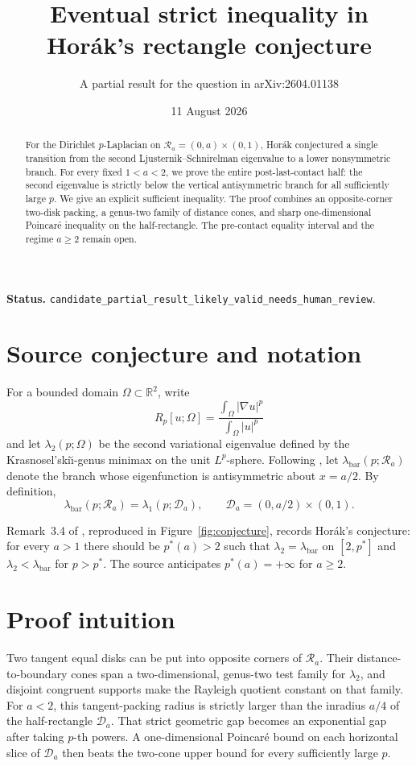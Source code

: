 \documentclass[11pt]{article}
\title{Eventual strict inequality in Hor\'ak's rectangle conjecture}
\author{A partial result for the question in arXiv:2604.01138}
\date{11 August 2026}
\newcommand{\R}{\mathbb R}
\newcommand{\Ra}{\mathcal R_a}
\newcommand{\Da}{\mathcal D_a}
\newcommand{\lbar}{\lambda_{\mathrm{bar}}}
\begin{document}
\maketitle

\noindent\textbf{Status.}
\texttt{candidate\_partial\_result\_likely\_valid\_needs\_human\_review}.

\begin{abstract}
For the Dirichlet \(p\)-Laplacian on
\(\Ra=(0,a)\times(0,1)\), Hor\'ak conjectured a single transition from the
second Ljusternik--Schnirelman eigenvalue to a lower nonsymmetric branch.
For every fixed \(1<a<2\), we prove the entire post-last-contact half: the
second eigenvalue is strictly below the vertical antisymmetric branch for all
sufficiently large \(p\). We give an explicit sufficient inequality. The
proof combines an opposite-corner two-disk packing, a genus-two family of
distance cones, and sharp one-dimensional Poincar\'e inequality on the
half-rectangle. The pre-contact equality interval and the regime \(a\ge2\)
remain open.
\end{abstract}

\section{Source conjecture and notation}

For a bounded domain \(\Omega\subset\R^2\), write
\[
 R_p[u;\Omega]=
 \frac{\int_\Omega |\nabla u|^p}{\int_\Omega |u|^p}
\]
and let \(\lambda_2(p;\Omega)\) be the second variational eigenvalue defined
by the Krasnosel'ski\u\i{}-genus minimax on the unit \(L^p\)-sphere.
Following \cite{source}, let \(\lbar(p;\Ra)\) denote the branch whose
eigenfunction is antisymmetric about \(x=a/2\). By definition,
\[
 \lbar(p;\Ra)=\lambda_1(p;\Da),
 \qquad \Da=(0,a/2)\times(0,1).
\]

Remark~3.4 of \cite{source}, reproduced in
Figure~\ref{fig:conjecture}, records Hor\'ak's conjecture: for every \(a>1\)
there should be \(p^*(a)>2\) such that \(\lambda_2=\lbar\) on
\([2,p^*]\) and \(\lambda_2<\lbar\) for \(p>p^*\). The source anticipates
\(p^*(a)=+\infty\) for \(a\ge2\).

\section{Proof intuition}

Two tangent equal disks can be put into opposite corners of \(\Ra\). Their
distance-to-boundary cones span a two-dimensional, genus-two test family for
\(\lambda_2\), and disjoint congruent supports make the Rayleigh quotient
constant on that family. For \(a<2\), this tangent-packing radius is strictly
larger than the inradius \(a/4\) of the half-rectangle \(\Da\).
That strict geometric gap becomes an exponential gap after taking \(p\)-th
powers. A one-dimensional Poincar\'e bound on each horizontal slice of
\(\Da\) then beats the two-cone upper bound for every sufficiently large
\(p\).
\end{document}
